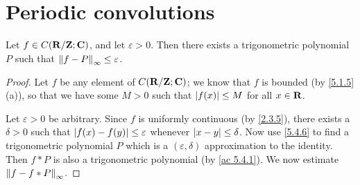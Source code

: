 \section{Periodic convolutions}\label{sec 5.4}

\begin{theorem}\label{5.4.1}
  Let \(f \in C(\R / \Z ; \C)\), and let \(\varepsilon > 0\).
  Then there exists a trigonometric polynomial \(P\) such that \(\norm*{f - P}_{\infty} \leq \varepsilon\).
\end{theorem}

\begin{proof}
  Let \(f\) be any element of \(C(\R / \Z ; \C)\);
  we know that \(f\) is bounded (by \cref{5.1.5}(a)), so that we have some \(M > 0\) such that \(\abs{f(x)} \leq M\) for all \(x \in \R\).

  Let \(\varepsilon > 0\) be arbitrary.
  Since \(f\) is uniformly continuous (by \cref{2.3.5}), there exists a \(\delta > 0\) such that \(\abs{f(x) - f(y)} \leq \varepsilon\) whenever \(\abs{x - y} \leq \delta\).
  Now use \cref{5.4.6} to find a trigonometric polynomial \(P\) which is a \((\varepsilon, \delta)\) approximation to the identity.
  Then \(f * P\) is also a trigonometric polynomial (by \cref{ac 5.4.1}).
  We now estimate \(\norm*{f - f * P}_{\infty}\).


\end{proof}
